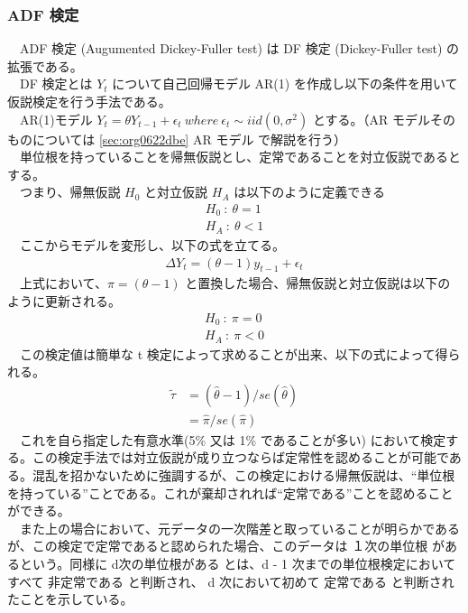 \documentclass{scrartcl}
\begin{document}
\newpage
\subsubsection{ADF 検定}
\label{sec:org509e8ed}
　ADF 検定 (Augumented Dickey-Fuller test) は DF 検定 (Dickey-Fuller test) の拡張である。\\
　DF 検定とは \(Y_t\) について自己回帰モデル AR(1) を作成し以下の条件を用いて仮説検定を行う手法である。\\
　AR(1)モデル \(Y_t = \theta Y_{t-1} + \epsilon_t \  where \ \epsilon_t \sim iid(0, \sigma^2)\) とする。（AR モデルそのものについては \ref{sec:org0622dbe} AR モデル で解説を行う）\\
　単位根を持っていることを帰無仮説とし、定常であることを対立仮説であるとする。\\
　つまり、帰無仮説 \(H_0\) と対立仮説 \(H_A\) は以下のように定義できる\\
\begin{align}
H_0\ :\ \theta = 1 \\
H_A\ :\ \theta < 1
\end{align}
　ここからモデルを変形し、以下の式を立てる。\\
\begin{align}
\Delta Y_t = (\theta - 1) y_{t-1} + \epsilon_t   
\end{align}
　上式において、\(\pi = (\theta - 1)\) と置換した場合、帰無仮説と対立仮説は以下のように更新される。\\
\begin{align}
H_0\ :\ \pi = 0 \\
H_A\ :\ \pi < 0
\end{align}
　この検定値は簡単な t 検定によって求めることが出来、以下の式によって得られる。\\
    \begin{align}
\widetilde{\tau} &= (\hat{\theta} - 1) / {se(\hat{\theta})} \nonumber \\ 
                 &= \hat{\pi} / se(\hat{\pi})
    \end{align}
　これを自ら指定した有意水準(5\% 又は 1\% であることが多い) において検定する。この検定手法では対立仮説が成り立つならば定常性を認めることが可能である。混乱を招かないために強調するが、この検定における帰無仮説は、``単位根を持っている''ことである。これが棄却されれば``定常である''ことを認めることができる。\\
　また上の場合において、元データの一次階差と取っていることが明らかであるが、この検定で定常であると認められた場合、このデータは １次の単位根 があるという。同様に d次の単位根がある とは、d - 1 次までの単位根検定においてすべて 非定常である と判断され、 d 次において初めて 定常である と判断されたことを示している。\\
\end{document}
